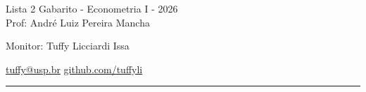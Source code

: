 \documentclass[12pt,letterpaper, onecolumn]{exam}
\begin{document}
\begingroup  
    \centering
    \LARGE Lista 2 Gabarito - Econometria I - 2026\\[0.5em]
    \large Prof: André Luiz Pereira Mancha \par
    \large Monitor: Tuffy Licciardi Issa  \par
   \small \href{mailto:tuffy@usp.br}{tuffy@usp.br} \quad
\href{https://github.com/Tuffyli}{github.com/tuffyli} \par
\endgroup
\rule{\textwidth}{0.4pt}
\pointsdroppedatright   %
\printanswers
\renewcommand{\solutiontitle}{\noindent\textbf{Ans:}\enspace}   %
\end{document}
